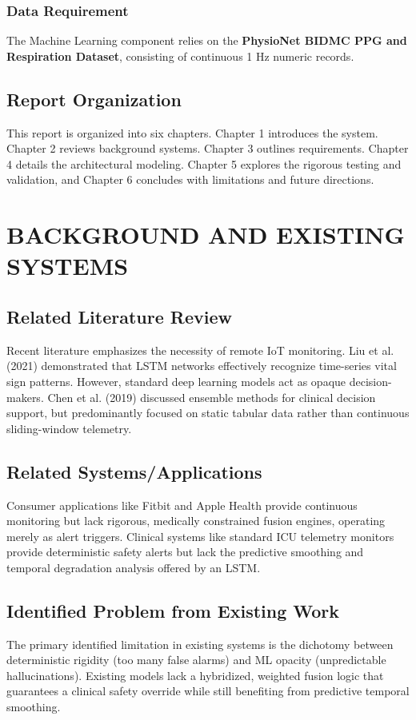 \documentclass[12pt,a4paper]{report}
\begin{document}
\subsection{Data Requirement}
The Machine Learning component relies on the \textbf{PhysioNet BIDMC PPG and Respiration Dataset}, consisting of continuous 1 Hz numeric records.

\section{Report Organization}
This report is organized into six chapters. Chapter 1 introduces the system. Chapter 2 reviews background systems. Chapter 3 outlines requirements. Chapter 4 details the architectural modeling. Chapter 5 explores the rigorous testing and validation, and Chapter 6 concludes with limitations and future directions.

\chapter{BACKGROUND AND EXISTING SYSTEMS}

\section{Related Literature Review}
Recent literature emphasizes the necessity of remote IoT monitoring. Liu et al. (2021) demonstrated that LSTM networks effectively recognize time-series vital sign patterns. However, standard deep learning models act as opaque decision-makers. Chen et al. (2019) discussed ensemble methods for clinical decision support, but predominantly focused on static tabular data rather than continuous sliding-window telemetry.

\section{Related Systems/Applications}
Consumer applications like Fitbit and Apple Health provide continuous monitoring but lack rigorous, medically constrained fusion engines, operating merely as alert triggers. Clinical systems like standard ICU telemetry monitors provide deterministic safety alerts but lack the predictive smoothing and temporal degradation analysis offered by an LSTM.

\section{Identified Problem from Existing Work}
The primary identified limitation in existing systems is the dichotomy between deterministic rigidity (too many false alarms) and ML opacity (unpredictable hallucinations). Existing models lack a hybridized, weighted fusion logic that guarantees a clinical safety override while still benefiting from predictive temporal smoothing. 
\end{document}
